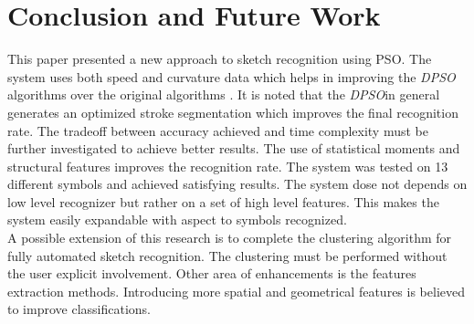 \documentclass[a4paper,10pt]{IEEEconf}
\begin{document}
\section{Conclusion and Future Work}
\label{ConclusionandFutureWork}
This paper presented a new approach to sketch recognition using PSO. The system uses both speed and curvature data which helps in improving the \textit{DPSO} algorithms over the original algorithms \cite{CruveDivisionSwarm,PolygonApproximationPSO}. It is noted that the \textit{DPSO}in general generates an optimized stroke segmentation which improves the final recognition rate.  The tradeoff between accuracy achieved and time complexity must be further investigated to achieve better results. The use of statistical moments and structural features improves the recognition rate. The system was tested on 13 different symbols and achieved satisfying results. The system dose not depends on low level recognizer but rather on a set of high level features. This makes the system easily expandable with aspect to symbols recognized. \\  
A possible extension of this research is to complete the clustering algorithm for fully automated sketch recognition. The clustering must be performed without the user explicit involvement. Other area of enhancements is the features extraction methods. Introducing more spatial and geometrical features is believed to improve classifications.  %
%

\end{document}
